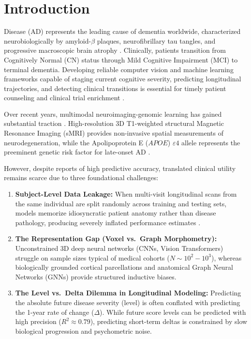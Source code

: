 \documentclass[journal,twocolumn]{IEEEtran}
\newcommand{\APOE}{\textit{APOE}}
\begin{document}
\section{Introduction}
 Disease (AD) represents the leading cause of dementia worldwide, characterized neurobiologically by amyloid-$\beta$ plaques, neurofibrillary tau tangles, and progressive macroscopic brain atrophy \cite{jack2018nia, scheltens2021alzheimer}. Clinically, patients transition from Cognitively Normal (CN) status through Mild Cognitive Impairment (MCI) to terminal dementia. Developing reliable computer vision and machine learning frameworks capable of staging current cognitive severity, predicting longitudinal trajectories, and detecting clinical transitions is essential for timely patient counseling and clinical trial enrichment \cite{frisoni2010clinical}.

Over recent years, multimodal neuroimaging-genomic learning has gained substantial traction \cite{dolci2025interpretable, chakraborty2020deep}. High-resolution 3D T1-weighted structural Magnetic Resonance Imaging (sMRI) provides non-invasive spatial measurements of neurodegeneration, while the Apolipoprotein E ($\APOE$) $\varepsilon4$ allele represents the preeminent genetic risk factor for late-onset AD \cite{cordeau2020apoe}.

However, despite reports of high predictive accuracy, translated clinical utility remains scarce due to three foundational challenges:
\begin{enumerate}
    \item \textbf{Subject-Level Data Leakage:} When multi-visit longitudinal scans from the same individual are split randomly across training and testing sets, models memorize idiosyncratic patient anatomy rather than disease pathology, producing severely inflated performance estimates \cite{wen2020convolutional, yagis2021effect}.
    \item \textbf{The Representation Gap (Voxel vs.\ Graph Morphometry):} Unconstrained 3D deep neural networks (CNNs, Vision Transformers) struggle on sample sizes typical of medical cohorts ($N \sim 10^2 - 10^3$), whereas biologically grounded cortical parcellations and anatomical Graph Neural Networks (GNNs) provide structured inductive biases.
    \item \textbf{The Level vs.\ Delta Dilemma in Longitudinal Modeling:} Predicting the absolute future disease severity (level) is often conflated with predicting the 1-year rate of change ($\Delta$). While future score levels can be predicted with high precision ($R^2 \approx 0.79$), predicting short-term deltas is constrained by slow biological progression and psychometric noise.
\end{enumerate}
\end{document}
